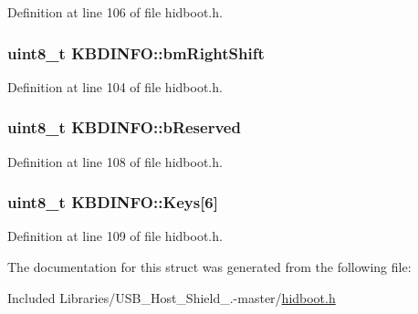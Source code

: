 \-Definition at line 106 of file hidboot.\-h.

\hypertarget{struct_k_b_d_i_n_f_o_acf82b510a3676bf60c122ad500c216c9}{
\subsubsection[{bm\-Right\-Shift}]{\setlength{\rightskip}{0pt plus 5cm}uint8\-\_\-t {\bf \-K\-B\-D\-I\-N\-F\-O\-::bm\-Right\-Shift}}}\label{struct_k_b_d_i_n_f_o_acf82b510a3676bf60c122ad500c216c9}


\-Definition at line 104 of file hidboot.\-h.

\hypertarget{struct_k_b_d_i_n_f_o_a91061aae6b2f52c94b1ed734def585a0}{
\subsubsection[{b\-Reserved}]{\setlength{\rightskip}{0pt plus 5cm}uint8\-\_\-t {\bf \-K\-B\-D\-I\-N\-F\-O\-::b\-Reserved}}}\label{struct_k_b_d_i_n_f_o_a91061aae6b2f52c94b1ed734def585a0}


\-Definition at line 108 of file hidboot.\-h.

\hypertarget{struct_k_b_d_i_n_f_o_a942e4eb5551fbe8958e858057391dd2d}{
\subsubsection[{\-Keys}]{\setlength{\rightskip}{0pt plus 5cm}uint8\-\_\-t {\bf \-K\-B\-D\-I\-N\-F\-O\-::\-Keys}\mbox{[}6\mbox{]}}}\label{struct_k_b_d_i_n_f_o_a942e4eb5551fbe8958e858057391dd2d}


\-Definition at line 109 of file hidboot.\-h.



\-The documentation for this struct was generated from the following file\-:\begin{DoxyCompactItemize}
\item 
\-Included Libraries/\-U\-S\-B\-\_\-\-Host\-\_\-\-Shield\-\_.-\/master/\hyperlink{hidboot_8h}{hidboot.\-h}\end{DoxyCompactItemize}
